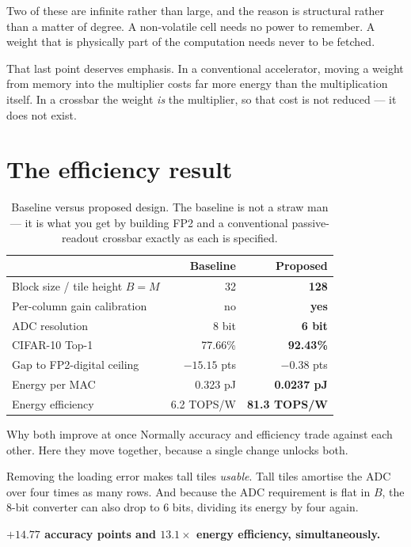 \documentclass[11pt,a4paper]{report}
\begin{document}
Two of these are infinite rather than large, and the reason is structural
rather than a matter of degree. A non-volatile cell needs no power to
remember. A weight that is physically part of the computation needs never to
be fetched.

That last point deserves emphasis. In a conventional accelerator, moving a
weight from memory into the multiplier costs far more energy than the
multiplication itself. In a crossbar the weight \emph{is} the multiplier, so
that cost is not reduced --- it does not exist.

\section{The efficiency result}

\begin{table}[h]
\centering
\caption{Baseline versus proposed design. The baseline is not a straw man ---
it is what you get by building FP2 and a conventional passive-readout crossbar
exactly as each is specified.}
\begin{tabular}{lrr}
\toprule
 & Baseline & \textbf{Proposed} \\
\midrule
Block size / tile height $B = M$ & 32 & \textbf{128} \\
Per-column gain calibration & no & \textbf{yes} \\
ADC resolution & 8 bit & \textbf{6 bit} \\
\midrule
CIFAR-10 Top-1 & 77.66\% & \textbf{92.43\%} \\
Gap to FP2-digital ceiling & $-15.15$ pts & $\mathbf{-0.38}$ pts \\
Energy per MAC & 0.323 pJ & \textbf{0.0237 pJ} \\
Energy efficiency & 6.2 TOPS/W & \textbf{81.3 TOPS/W} \\
\bottomrule
\end{tabular}
\end{table}

\begin{keybox}{Why both improve at once}
Normally accuracy and efficiency trade against each other. Here they move
together, because a single change unlocks both.

Removing the loading error makes tall tiles \emph{usable}. Tall tiles amortise
the ADC over four times as many rows. And because the ADC requirement is flat
in $B$, the 8-bit converter can also drop to 6 bits, dividing its energy by
four again.

\textbf{$+14.77$ accuracy points and $13.1\times$ energy efficiency,
simultaneously.}
\end{keybox}
\end{document}
